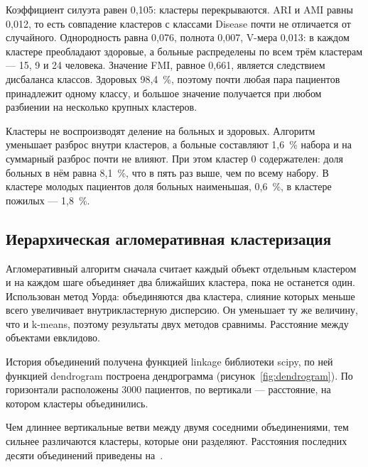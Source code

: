 \documentclass[a4paper,14pt]{extarticle}
\begin{document}


Коэффициент силуэта равен 0,105: кластеры перекрываются. ARI и AMI равны 0,012, то есть совпадение кластеров с классами Disease почти не отличается от случайного. Однородность равна 0,076, полнота 0,007, V-мера 0,013: в каждом кластере преобладают здоровые, а больные распределены по всем трём кластерам — 15, 9 и 24 человека. Значение FMI, равное 0,661, является следствием дисбаланса классов. Здоровых 98,4~\%, поэтому почти любая пара пациентов принадлежит одному классу, и большое значение получается при любом разбиении на несколько крупных кластеров.

Кластеры не воспроизводят деление на больных и здоровых. Алгоритм уменьшает разброс внутри кластеров, а больные составляют 1,6~\% набора и на суммарный разброс почти не влияют. При этом кластер 0 содержателен: доля больных в нём равна 8,1~\%, что в пять раз выше, чем по всему набору. В кластере молодых пациентов доля больных наименьшая, 0,6~\%, в кластере пожилых — 1,8~\%.

\subsection{Иерархическая агломеративная кластеризация}

Агломеративный алгоритм сначала считает каждый объект отдельным кластером и на каждом шаге объединяет два ближайших кластера, пока не останется один. Использован метод Уорда: объединяются два кластера, слияние которых меньше всего увеличивает внутрикластерную дисперсию. Он уменьшает ту же величину, что и k-means, поэтому результаты двух методов сравнимы. Расстояние между объектами евклидово.

История объединений получена функцией linkage библиотеки scipy, по ней функцией dendrogram построена дендрограмма (рисунок~\ref{fig:dendrogram}). По горизонтали расположены 3000 пациентов, по вертикали — расстояние, на котором кластеры объединились.


Чем длиннее вертикальные ветви между двумя соседними объединениями, тем сильнее различаются кластеры, которые они разделяют. Расстояния последних десяти объединений приведены на~.

\end{document}
